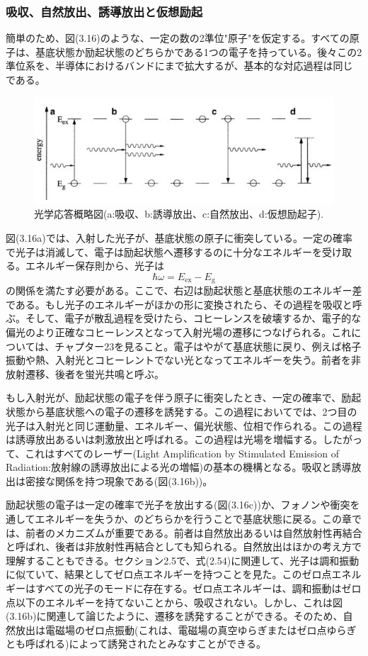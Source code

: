 \documentclass[11pt,a4j,uplatex]{jsarticle}
\begin{document}
\subsubsection{吸収、自然放出、誘導放出と仮想励起}
簡単のため、図(3.16)のような、一定の数の2準位"原子"を仮定する。すべての原子は、基底状態か励起状態のどちらかである1つの電子を持っている。後々この2準位系を、半導体におけるバンドにまで拡大するが、基本的な対応過程は同じである。
\begin{figure}[b]
  \includegraphics[clip]{4way.jpeg}
  \caption{光学応答概略図(a:吸収、b:誘導放出、c:自然放出、d:仮想励起子).}
\end{figure}
図(3.16a)では、入射した光子が、基底状態の原子に衝突している。一定の確率で光子は消滅して、電子は励起状態へ遷移するのに十分なエネルギーを受け取る。エネルギー保存則から、光子は
\begin{equation}
  \hbar\omega=E_{\mathrm{ex}}-E_{\mathrm{g}}\tag{3.36}
\end{equation}
の関係を満たす必要がある。ここで、右辺は励起状態と基底状態のエネルギー差である。もし光子のエネルギーがほかの形に変換されたら、その過程を吸収と呼ぶ。そして、電子が散乱過程を受けたら、コヒーレンスを破壊するか、電子的な偏光のより正確なコヒーレンスとなって入射光場の遷移につなげられる。これについては、チャプター23を見ること。電子はやがて基底状態に戻り、例えば格子振動や熱、入射光とコヒーレントでない光となってエネルギーを失う。前者を非放射遷移、後者を蛍光共鳴と呼ぶ。

もし入射光が、励起状態の電子を伴う原子に衝突したとき、一定の確率で、励起状態から基底状態への電子の遷移を誘発する。この過程においてでは、2つ目の光子は入射光と同じ運動量、エネルギー、偏光状態、位相で作られる。この過程は誘導放出あるいは刺激放出と呼ばれる。この過程は光場を増幅する。したがって、これはすべてのレーザー(Light Amplification by Stimulated Emission of Radiation:放射線の誘導放出による光の増幅)の基本の機構となる。吸収と誘導放出は密接な関係を持つ現象である(図(3.16b))。

励起状態の電子は一定の確率で光子を放出する(図(3.16c))か、フォノンや衝突を通してエネルギーを失うか、のどちらかを行うことで基底状態に戻る。この章では、前者のメカニズムが重要である。前者は自然放出あるいは自然放射性再結合と呼ばれ、後者は非放射性再結合としても知られる。自然放出はほかの考え方で理解することもできる。セクション2.5で、式(2.54)に関連して、光子は調和振動に似ていて、結果としてゼロ点エネルギーを持つことを見た。このゼロ点エネルギーはすべての光子のモードに存在する。ゼロ点エネルギーは、調和振動はゼロ点以下のエネルギーを持てないことから、吸収されない。しかし、これは図(3.16b)に関連して論じたように、遷移を誘発することができる。そのため、自然放出は電磁場のゼロ点振動(これは、電磁場の真空ゆらぎまたはゼロ点ゆらぎとも呼ばれる)によって誘発されたとみなすことができる。
\end{document}
